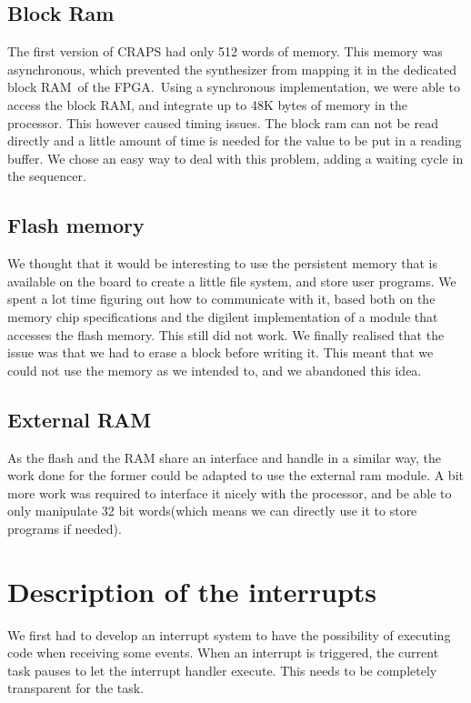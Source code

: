 \documentclass[openany, a4paper]{book}
\begin{document}
        \subsection{Block Ram}
            The first version of CRAPS had only 512 words of memory. This
            memory was asynchronous, which prevented the synthesizer from
            mapping it in the dedicated block RAM of the FPGA. Using a
            synchronous implementation, we were able to access the block RAM,
            and integrate up to 48K bytes of memory in the processor. This 
            however caused timing issues. The block ram can not be read directly
            and a little amount of time is needed for the value to be put in a
            reading buffer. We chose an easy way to deal with this problem, 
            adding a waiting cycle in the sequencer. 
        \subsection{Flash memory}
            We thought that it would be interesting to use the persistent memory
            that is available on the board to create a little file system, and 
            store user programs. We spent a lot time figuring out how to
            communicate with it, based both on the memory chip specifications
            and the digilent implementation of a module that accesses the flash
            memory. This still did not work. We finally realised that the issue 
            was that we had to erase a block before writing it. This meant that
            we could not use the memory as we intended to, and we abandoned this
            idea.

        \subsection{External RAM}
            As the flash and the RAM share an interface and handle in a similar
            way, the work done for the former could be adapted to use the
            external ram module. A bit more work was required to interface it
            nicely with the processor, and be able to only manipulate 32 bit
            words(which means we can directly use it to store programs if
            needed). 
    \section{Description of the interrupts}
      We first had to develop an interrupt system to have the possibility of
      executing code when receiving some events. When an interrupt is triggered,
      the current task pauses to let the interrupt handler execute. This needs
      to be completely transparent for the task.
\end{document}
